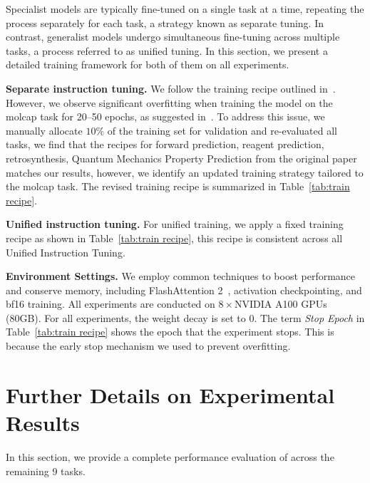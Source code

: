 Specialist models are typically fine-tuned on a single task at a time, repeating the process separately for each task, a strategy known as separate tuning. In contrast, generalist models undergo simultaneous fine-tuning across multiple tasks, a process referred to as unified tuning. In this section, we present a detailed training framework for both of them on all experiments.

\noindent\textbf{Separate instruction tuning.} We follow the training recipe outlined in~\citet{cao2023instructmol}. However, we observe significant overfitting when training the model on the molcap task for 20–50 epochs, as suggested in~\citet{cao2023instructmol}. To address this issue, we manually allocate $10\%$ of the training set for validation and re-evaluated all tasks, we find that the recipes for forward prediction, reagent prediction, retrosynthesis, Quantum Mechanics Property Prediction from the original paper matches our results, however, we identify an updated training strategy tailored to the molcap task. The revised training recipe is summarized in Table~\ref{tab:train recipe}.

\noindent\textbf{Unified instruction tuning.} For unified training, we apply a fixed training recipe as shown in Table~\ref{tab:train recipe}, this recipe is consistent across all Unified Instruction Tuning.

\noindent\textbf{Environment Settings.} We employ common techniques to boost performance and conserve memory, including FlashAttention 2~\cite{dao2022flashattention}, activation checkpointing, and bf16 training. All experiments are conducted on $8\times$NVIDIA A100 GPUs (80GB).
For all experiments, the weight decay is set to 0. The term \textit{Stop Epoch} in Table~\ref{tab:train recipe} shows the epoch that the experiment stops. This is because the early stop mechanism we used to prevent overfitting.



\section{Further Details on Experimental Results}
\label{sec:more results}
In this section, we provide a complete performance evaluation of \method across the remaining 9 tasks.

